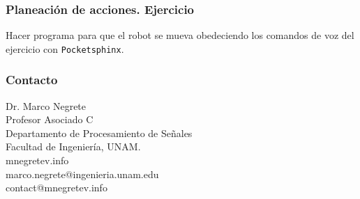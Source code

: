 \documentclass[10pt,spanish,aspectratio=1610]{beamer}
\begin{document}
\begin{frame}\frametitle{Planeación de acciones. Ejercicio}
Hacer programa para que el robot se mueva obedeciendo los comandos de voz del ejercicio con \texttt{Pocketsphinx}.
\end{frame}

\begin{frame}\frametitle{Contacto}
  Dr. Marco Negrete\\
  Profesor Asociado C\\
  Departamento de Procesamiento de Señales\\
  Facultad de Ingeniería, UNAM.
\[\]
mnegretev.info\\
marco.negrete@ingenieria.unam.edu\\
contact@mnegretev.info 
\end{frame}
\end{document}
